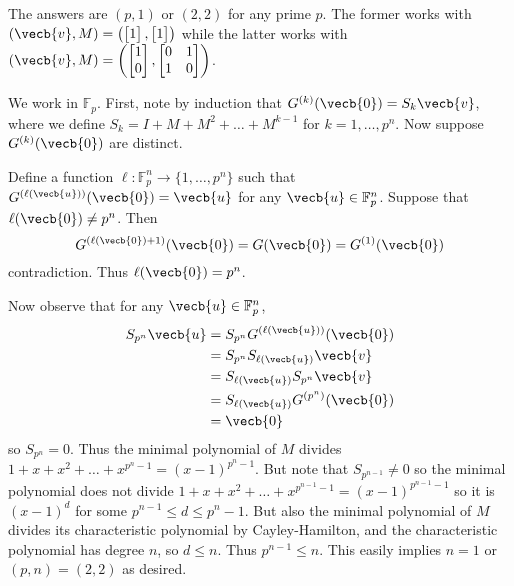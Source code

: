 The answers are $(p,1)$ or $(2,2)$ for any prime $p$. The former works with $\left(\vecb{v},M\right)=\left(\begin{bmatrix} 1 \end{bmatrix},\begin{bmatrix} 1 \end{bmatrix}\right)$ while the latter works with $\left(\vecb{v},M\right)=\left(\begin{bmatrix} 1 \\ 0 \end{bmatrix},\begin{bmatrix} 0 & 1 \\ 1 & 0 \end{bmatrix}\right)$.

We work in $\mathbb{F}_p$. First, note by induction that $G^{(k)}(\vecb{0})=S_k\vecb{v}$, where we define $S_k=I+M+M^2+\ldots+M^{k-1}$ for $k=1,\ldots,p^n$. Now suppose $G^{(k)}(\vecb{0})$ are distinct.

Define a function $\ell:\mathbb{F}_p^n\to\{1,\ldots,p^n\}$ such that $G^{(\ell(\vecb{u}))}(\vecb{0})=\vecb{u}$ for any $\vecb{u}\in\mathbb{F}_p^n$. Suppose that $\ell(\vecb{0})\neq p^n$. Then
\[
	G^{(\ell(\vecb{0})+1)}(\vecb{0})=G(\vecb{0})=G^{(1)}(\vecb{0})
\]
contradiction. Thus $\ell(\vecb{0})=p^n$.

Now observe that for any $\vecb{u}\in\mathbb{F}_p^n$,
\begin{align*}
	S_{p^n}\vecb{u} &= S_{p^n}G^{(\ell(\vecb{u}))}(\vecb{0}) \\
	&= S_{p^n}S_{\ell(\vecb{u})}\vecb{v} \\
	&= S_{\ell(\vecb{u})}S_{p^n}\vecb{v} \\
	&= S_{\ell(\vecb{u})}G^{(p^n)}(\vecb{0}) \\
	&= \vecb{0}
\end{align*}
so $S_{p^n}=0$. Thus the minimal polynomial of $M$ divides $1+x+x^2+\ldots+x^{p^n-1}=(x-1)^{p^n-1}$. But note that $S_{p^{n-1}}\neq0$ so the minimal polynomial does not divide $1+x+x^2+\ldots+x^{p^{n-1}-1}=(x-1)^{p^{n-1}-1}$ so it is $(x-1)^d$ for some $p^{n-1}\leq d\leq p^n-1$. But also the minimal polynomial of $M$ divides its characteristic polynomial by Cayley-Hamilton, and the characteristic polynomial has degree $n$, so $d\leq n$. Thus $p^{n-1}\leq n$. This easily implies $n=1$ or $(p,n)=(2,2)$ as desired.